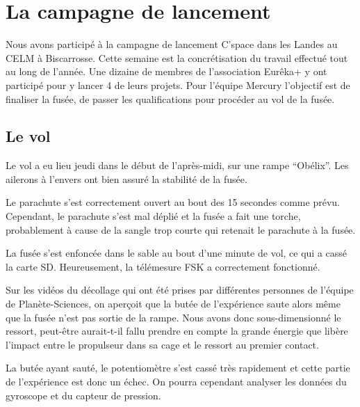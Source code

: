 \documentclass[a4paper,12pt]{scrartcl}
\begin{document}
	 \newpage

	\section{La campagne de lancement}
	
	Nous avons participé à la campagne de lancement C'space dans les Landes au \textsc{CELM} à Biscarrosse.
	Cette semaine est la concrétisation du travail effectué tout au long de l'année.
	Une dizaine de membres de l'association Eurêka+ y ont participé pour y lancer 4 de leurs projets.
	Pour l'équipe Mercury l'objectif est de finaliser la fusée, de passer les qualifications pour procéder au vol de la fusée.

	  \subsection{Le vol}
	  
	  Le vol a eu lieu jeudi dans le début de l'après-midi, sur une rampe ``Obélix''. 	
	  Les ailerons à l'envers ont bien assuré la stabilité de la fusée.

	  Le parachute s'est correctement ouvert au bout des 15 secondes comme prévu.
	  Cependant, le parachute s'est mal déplié et la fusée a fait une torche, probablement à cause de la sangle trop courte qui retenait le parachute à la fusée.
	  
	  La fusée s'est enfoncée dans le sable au bout d'une minute de vol, ce qui a cassé la carte SD. Heureusement, la télémesure FSK a correctement fonctionné.
	  
	  Sur les vidéos du décollage qui ont été prises par différentes personnes de l'équipe de Planète-Sciences, on aperçoit que la butée de l'expérience saute alors même que la fusée n'est pas sortie de la rampe.
	  Nous avons donc sous-dimensionné le ressort, peut-être aurait-t-il fallu prendre en compte la grande énergie que libère l'impact entre le propulseur dans sa cage et le ressort au premier contact.
	  
	  La butée ayant sauté, le potentiomètre s'est cassé très rapidement et cette partie de l'expérience est donc un échec.
	  On pourra cependant analyser les données du gyroscope et du capteur de pression.
\end{document}
